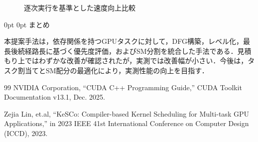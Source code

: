 \documentclass[a4paper,11pt,lualatex,ja=standard]{bxjsarticle}
\makeatletter
\renewcommand{\section}{\@startsection{section}{1}{\z@}%
   {0pt}%
   {0pt}%
   {\reset@font\large\bfseries}}   %
\makeatother
\begin{document}
\begin{figure}[t]
\centering
{}
\caption{逐次実行を基準とした速度向上比較}
\end{figure}

\section{まとめ}

本提案手法は，依存関係を持つGPUタスクに対して，DFG構築，レベル化，最長後続経路長に基づく優先度評価，およびSM分割を統合した手法である．見積もり上ではわずかな改善が確認されたが，実測では改善幅が小さい．今後は，タスク割当てとSM配分の最適化により，実測性能の向上を目指す．

\begin{thebibliography}{99}
NVIDIA Corporation, ``CUDA C++ Programming Guide,'' CUDA Toolkit Documentation v13.1, Dec. 2025.

Zejia Lin, et.al, ``KeSCo: Compiler-based Kernel Scheduling for Multi-task GPU Applications,'' in 2023 IEEE 41st International Conference on Computer Design (ICCD), 2023.
\end{thebibliography}


\end{document}
